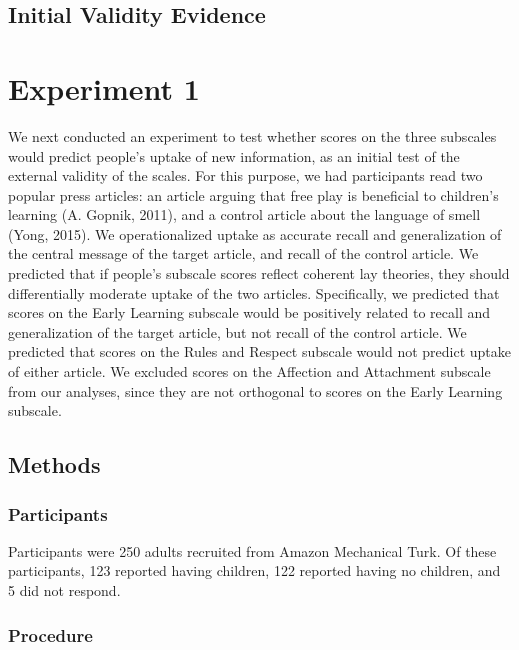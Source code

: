 \documentclass[10pt, letterpaper]{article}
\begin{document}
\subsection{Initial Validity Evidence}\label{initial-validity-evidence}

\section{Experiment 1}\label{experiment-1}

We next conducted an experiment to test whether scores on the three
subscales would predict people's uptake of new information, as an
initial test of the external validity of the scales. For this purpose,
we had participants read two popular press articles: an article arguing
that free play is beneficial to children's learning (A. Gopnik, 2011),
and a control article about the language of smell (Yong, 2015). We
operationalized uptake as accurate recall and generalization of the
central message of the target article, and recall of the control
article. We predicted that if people's subscale scores reflect coherent
lay theories, they should differentially moderate uptake of the two
articles. Specifically, we predicted that scores on the Early Learning
subscale would be positively related to recall and generalization of the
target article, but not recall of the control article. We predicted that
scores on the Rules and Respect subscale would not predict uptake of
either article. We excluded scores on the Affection and Attachment
subscale from our analyses, since they are not orthogonal to scores on
the Early Learning subscale.

\subsection{Methods}\label{methods}

\subsubsection{Participants}\label{participants}

Participants were 250 adults recruited from Amazon Mechanical Turk. Of
these participants, 123 reported having children, 122 reported having no
children, and 5 did not respond.

\subsubsection{Procedure}\label{procedure}
\end{document}
